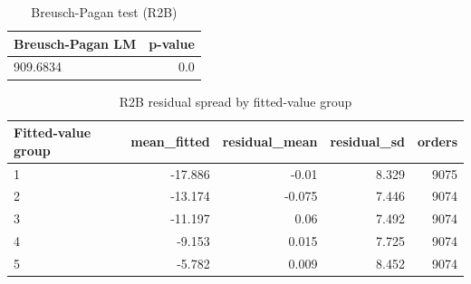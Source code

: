 \begin{table}[htbp]
\centering
\small
\caption{Breusch-Pagan test (R2B)}
\begin{tabular}{lr}
\toprule
Breusch-Pagan LM & p-value \\
\midrule
909.6834 & 0.0 \\
\bottomrule
\end{tabular}
\par\smallskip\begin{minipage}{\linewidth}\footnotesize \end{minipage}
\end{table}


\begin{table}[htbp]
\centering
\small
\caption{R2B residual spread by fitted-value group}
\begin{tabular}{lrrrr}
\toprule
Fitted-value group & mean\_fitted & residual\_mean & residual\_sd & orders \\
\midrule
1 & -17.886 & -0.01 & 8.329 & 9075 \\
2 & -13.174 & -0.075 & 7.446 & 9074 \\
3 & -11.197 & 0.06 & 7.492 & 9074 \\
4 & -9.153 & 0.015 & 7.725 & 9074 \\
5 & -5.782 & 0.009 & 8.452 & 9074 \\
\bottomrule
\end{tabular}
\par\smallskip\begin{minipage}{\linewidth}\footnotesize \end{minipage}
\end{table}

